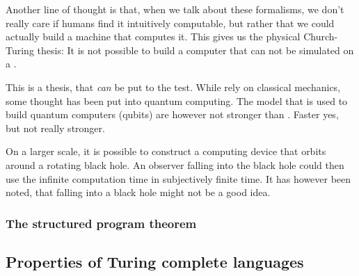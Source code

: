 Another line of thought is that, when we talk about these formalisms, we 
don't really care if humans find it intuitively computable, but rather that 
we could actually build a machine that computes it. This gives us the 
physical Church-Turing thesis: It is not possible to build a computer that 
can not be simulated on a \TM.

This is a thesis, that {\em can} be put to the test. While \TM rely on 
classical mechanics, some thought has been put into quantum computing. The 
model that is used to build quantum computers (qubits) are however not 
stronger than \TM. Faster yes, but not really stronger.

On a larger scale, it is possible to construct a computing device that orbits 
around a rotating black hole. An observer falling into the black hole could 
then use the infinite computation time in subjectively finite time. It has 
however been noted, that falling into a black hole might not be a good 
idea\citationneeded.

\subsubsection{The structured program theorem}

\subsection{Properties of Turing complete languages}

